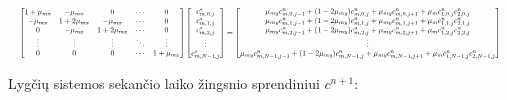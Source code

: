 \begin{align*}
  \resizebox{\textwidth}{!}{$
  \begin{bmatrix}
    1 + \mu_{mx} & -\mu_{mx} & 0 & \cdots & 0\\
    -\mu_{mx} & 1 + 2\mu_{mx} & -\mu_{mx} & \cdots & 0\\
    0 & -\mu_{mx} & 1 + 2\mu_{mx} & \cdots & 0\\
    \vdots & \vdots & \vdots & \ddots & \vdots\\
    0 & 0 & 0 & \cdots & 1 + \mu_{mx}
  \end{bmatrix}
  \begin{bmatrix}
    c^*_{m,0,j}\\
    c^*_{m,1,j}\\
    c^*_{m,2,j}\\
    \vdots\\
    c^*_{m,N-1,j}
  \end{bmatrix}
  =
  \begin{bmatrix}
    \mu_{my}c^n_{m,0,j-1}+(1-2\mu_{my})c^n_{m,0,j}+\mu_{my}c^n_{m,0,j+1}+\mu_m c^n_{1,0,j}c^n_{2,0,j}\\
    \mu_{my}c^n_{m,1,j-1}+(1-2\mu_{my})c^n_{m,1,j}+\mu_{my}c^n_{m,1,j+1}+\mu_m c^n_{1,1,j}c^n_{2,1,j}\\
    \mu_{my}c^n_{m,2,j-1}+(1-2\mu_{my})c^n_{m,2,j}+\mu_{my}c^n_{m,2,j+1}+\mu_m c^n_{1,2,j}c^n_{2,2,j}\\
    \vdots\\
    \mu_{my}c^n_{m,N-1,j-1}+(1-2\mu_{my})c^n_{m,N-1,j}+\mu_{my}c^n_{m,N-1,j+1}+\mu_m c^n_{1,N-1,j}c^n_{2,N-1,j}
  \end{bmatrix}
  $}
\end{align*}

Lygčių sistemos sekančio laiko žingsnio sprendiniui $c^{n+1}$:

